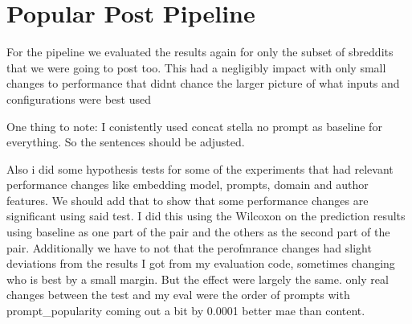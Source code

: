\section{Popular Post Pipeline}

For the pipeline we evaluated the results again for only the subset of sbreddits that we were going to post too. This had a negligibly impact with only small changes to performance that didnt chance the larger picture of what inputs and configurations were best used









One thing to note: I conistently used concat stella no prompt as baseline for everything. So the sentences should be adjusted. 

Also i did some hypothesis tests for some of the experiments that had relevant performance changes like embedding model, prompts, domain and author features. We should add that to show that some performance changes are significant using said test. I did this using the Wilcoxon on the prediction results using baseline as one part of the pair and the others as the second part of the pair. Additionally we have to not that the perofmrance changes had slight deviations from the results I got from my evaluation code, sometimes changing who is best by a small margin. But the effect were largely the same. only real changes between the test and my eval were the order of prompts with prompt_popularity coming out a bit by 0.0001 better mae than content.